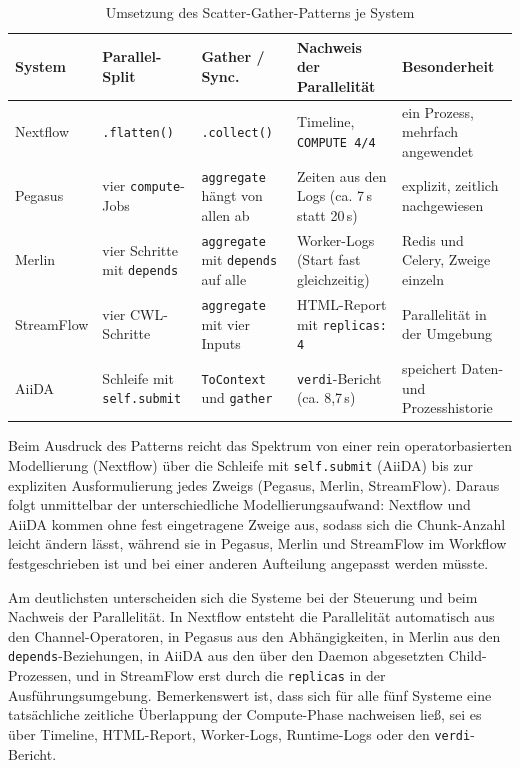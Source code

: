 \begin{table}[ht]
  \caption{Umsetzung des Scatter-Gather-Patterns je System}
  \label{tab:scattergather:composition}
  \centering
  \footnotesize
  \begin{tabular}{l p{2.5cm} p{2.5cm} p{2.7cm} p{2.6cm}}
    \hline
    \textbf{System} & \textbf{Parallel-Split} & \textbf{Gather / Sync.} & \textbf{Nachweis der Parallelität} & \textbf{Besonderheit} \\
    \hline
    Nextflow
      & \texttt{.flatten()}
      & \texttt{.collect()}
      & Timeline, \texttt{COMPUTE 4/4}
      & ein Prozess, mehrfach angewendet \\
    Pegasus
      & vier \texttt{compute}-Jobs
      & \texttt{aggregate} hängt von allen ab
      & Zeiten aus den Logs (ca. 7\,s statt 20\,s)
      & explizit, zeitlich nachgewiesen \\
    Merlin
      & vier Schritte mit \texttt{depends}
      & \texttt{aggregate} mit \texttt{depends} auf alle
      & Worker-Logs (Start fast gleichzeitig)
      & Redis und Celery, Zweige einzeln \\
    StreamFlow
      & vier CWL-Schritte
      & \texttt{aggregate} mit vier Inputs
      & HTML-Report mit \texttt{replicas: 4}
      & Parallelität in der Umgebung \\
    AiiDA
      & Schleife mit \texttt{self.submit}
      & \texttt{ToContext} und \texttt{gather}
      & \texttt{verdi}-Bericht (ca. 8,7\,s)
      & speichert Daten- und Prozesshistorie \\
    \hline
  \end{tabular}
\end{table}

Beim Ausdruck des Patterns reicht das Spektrum von einer rein operatorbasierten Modellierung
(Nextflow) über die Schleife mit \texttt{self.submit} (AiiDA) bis zur expliziten
Ausformulierung jedes Zweigs (Pegasus, Merlin, StreamFlow). Daraus folgt unmittelbar der
unterschiedliche Modellierungsaufwand: Nextflow und AiiDA kommen ohne fest eingetragene Zweige aus,
sodass sich die Chunk-Anzahl leicht ändern lässt, während sie in Pegasus, Merlin und StreamFlow im
Workflow festgeschrieben ist und bei einer anderen Aufteilung angepasst werden müsste.

Am deutlichsten unterscheiden sich die Systeme bei der Steuerung und beim Nachweis der
Parallelität. In Nextflow entsteht die Parallelität automatisch aus den Channel-Operatoren, in
Pegasus aus den Abhängigkeiten, in Merlin aus den \texttt{depends}-Beziehungen, in AiiDA aus den über den Daemon abgesetzten Child-Prozessen, und in StreamFlow erst durch die
\texttt{replicas} in der Ausführungsumgebung. Bemerkenswert ist, dass sich für alle fünf Systeme eine tatsächliche zeitliche Überlappung der Compute-Phase
nachweisen ließ, sei es über Timeline, HTML-Report, Worker-Logs, Runtime-Logs oder den
\texttt{verdi}-Bericht. 

